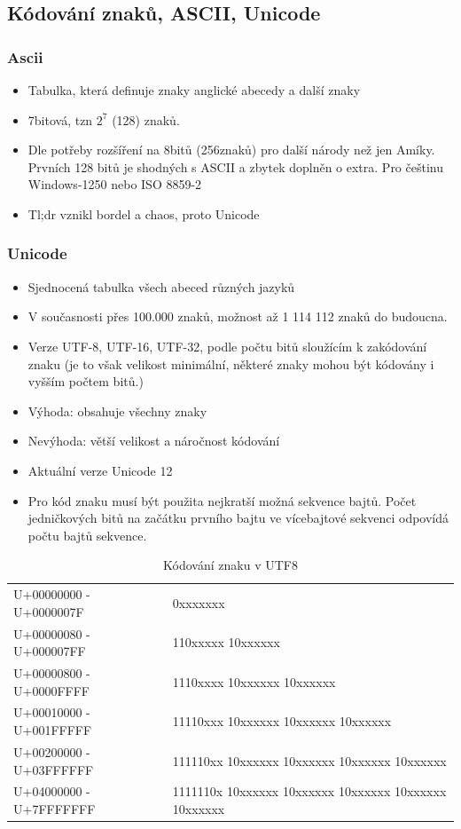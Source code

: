 \documentclass[10pt,a4paper]{article}
\begin{document}
\subsection{Kódování znaků, ASCII, Unicode}
\subsubsection{Ascii}
\begin{itemize}
\item Tabulka, která definuje znaky anglické abecedy a další znaky
\item 7bitová, tzn $2^7$ (128) znaků.
\item Dle potřeby rozšíření na 8bitů (256znaků) pro další národy než jen Amíky. Prvních 128 bitů je shodných s ASCII a zbytek doplněn o extra. Pro češtinu Windows-1250 nebo ISO 8859-2
\item Tl;dr vznikl bordel a chaos, proto Unicode
\end{itemize}


\subsubsection{Unicode}
\begin{itemize}
\item Sjednocená tabulka všech abeced různých jazyků
\item V současnosti přes 100.000 znaků, možnost až 1 114 112 znaků do budoucna.
\item Verze UTF-8, UTF-16, UTF-32, podle počtu bitů sloužícím k zakódování znaku (je to však velikost minimální, některé znaky mohou být kódovány i vyšším počtem bitů.)
\item Výhoda: obsahuje všechny znaky
\item Nevýhoda: větší velikost a náročnost kódování
\item Aktuální verze Unicode 12
\item Pro kód znaku musí být použita nejkratší možná sekvence bajtů. Počet jedničkových bitů na začátku prvního bajtu ve vícebajtové sekvenci odpovídá počtu bajtů sekvence.
\end{itemize}
\begin{table}[ht]
\centering
\begin{tabular}{l|l}
\hline
U+00000000 - U+0000007F & 0xxxxxxx                                              \\
U+00000080 - U+000007FF & 110xxxxx 10xxxxxx                                     \\
U+00000800 - U+0000FFFF & 1110xxxx 10xxxxxx 10xxxxxx                            \\
U+00010000 - U+001FFFFF & 11110xxx 10xxxxxx 10xxxxxx 10xxxxxx                   \\
U+00200000 - U+03FFFFFF & 111110xx 10xxxxxx 10xxxxxx 10xxxxxx 10xxxxxx          \\
U+04000000 - U+7FFFFFFF & 1111110x 10xxxxxx 10xxxxxx 10xxxxxx 10xxxxxx 10xxxxxx \\
\hline
\end{tabular}
\caption{Kódování znaku v UTF8}
\label{tab:utf8}
\end{table}
\end{document}
